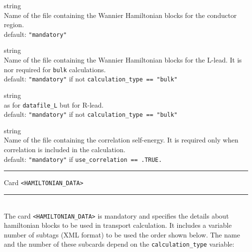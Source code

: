 {\noindent{}%
{\sc string} \\ Name of the file containing the Wannier Hamiltonian blocks for the
            conductor region. \\
            {\sc default}: {\tt "mandatory"} \par

\noindent{}%
{\sc string} \\ Name of the file containing the Wannier Hamiltonian blocks for the
            L-lead. It is nor required for {\tt bulk} calculations. \\
            {\sc default}: {\tt "mandatory"} if not {\tt calculation\_type == "bulk"} \par

\noindent{}%
{\sc string} \\ as for {\tt datafile\_L} but for R-lead. \\
            {\sc default}: {\tt "mandatory"} if not {\tt calculation\_type == "bulk"} \par

\noindent{}%
{\sc string} \\ Name of the file containing the correlation self-energy. It is required only 
            when correlation is included in the calculation. \\
            {\sc default}: {\tt "mandatory"} if {\tt use\_correlation == .TRUE.} \par
}
\bigskip

\begin{centering}
\rule{2.0in}{0.01in} Card {\tt <HAMILTONIAN\_DATA>} \rule{2.0in}{0.01in}
\end{centering}\\

\noindent The card {\tt <HAMILTONIAN\_DATA>} is mandatory and specifies
the details about hamiltonian blocks to be used in transport calculation. 
It includes a variable number of subtags (XML format)
to be used the order shown below. The name and the number of these subcards
depend on the {\tt calculation\_type} variable:

